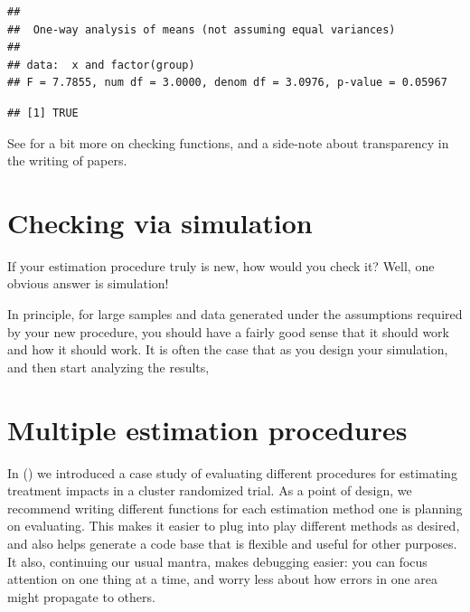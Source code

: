 \documentclass[
]{book}
\newenvironment{Shaded}{\begin{snugshade}}{\end{snugshade}}
\newcommand{\FunctionTok}[1]{\textcolor[rgb]{0.00,0.00,0.00}{#1}}
\newcommand{\NormalTok}[1]{#1}
\newcommand{\OtherTok}[1]{\textcolor[rgb]{0.56,0.35,0.01}{#1}}
\newcommand{\SpecialCharTok}[1]{\textcolor[rgb]{0.00,0.00,0.00}{#1}}
\begin{document}
\begin{verbatim}
## 
##  One-way analysis of means (not assuming equal variances)
## 
## data:  x and factor(group)
## F = 7.7855, num df = 3.0000, denom df = 3.0976, p-value = 0.05967
\end{verbatim}

\begin{Shaded}
\end{Shaded}

\begin{verbatim}
## [1] TRUE
\end{verbatim}

See \citet{sec_comp_efficiency} for a bit more on checking functions, and a side-note about transparency in the writing of papers.

\hypertarget{checking-via-simulation}{%
\section{Checking via simulation}\label{checking-via-simulation}}

If your estimation procedure truly is new, how would you check it?
Well, one obvious answer is simulation!

In principle, for large samples and data generated under the assumptions required by your new procedure, you should have a fairly good sense that it should work and how it should work.
It is often the case that as you design your simulation, and then start analyzing the results,

\hypertarget{multiple-estimation-procedures}{%
\section{Multiple estimation procedures}\label{multiple-estimation-procedures}}

In \citet{chap_DGP} (\citet{case_cluster}) we introduced a case study of evaluating different procedures for estimating treatment impacts in a cluster randomized trial.
As a point of design, we recommend writing different functions for each estimation method one is planning on evaluating. This makes it easier to plug into play different methods as desired, and also helps generate a code base that is flexible and useful for other purposes.
It also, continuing our usual mantra, makes debugging easier: you can focus attention on one thing at a time, and worry less about how errors in one area might propagate to others.
\end{document}
